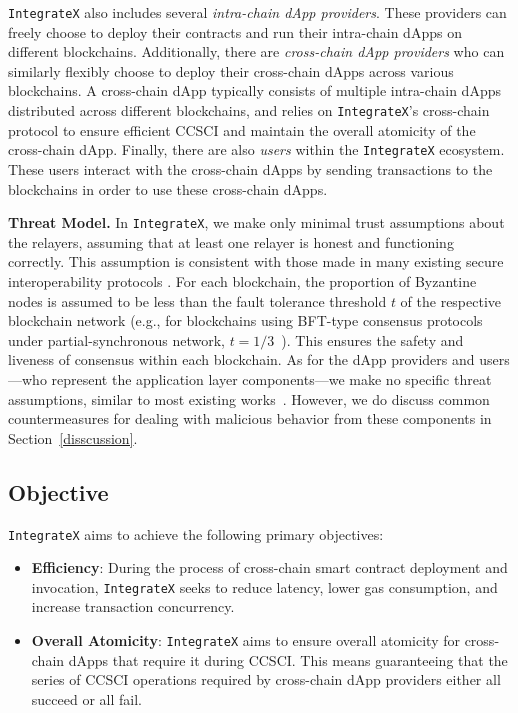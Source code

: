 \texttt{IntegrateX} also includes several \emph{intra-chain dApp providers}. 
These providers can freely choose to deploy their contracts and run their intra-chain dApps on different blockchains. 
Additionally, there are \emph{cross-chain dApp providers} who can similarly flexibly choose to deploy their cross-chain dApps across various blockchains. 
A cross-chain dApp typically consists of multiple intra-chain dApps distributed across different blockchains, and relies on \texttt{IntegrateX}'s cross-chain protocol to ensure efficient CCSCI and maintain the overall atomicity of the cross-chain dApp.
Finally, there are also \emph{users} within the \texttt{IntegrateX} ecosystem. 
These users interact with the cross-chain dApps by sending transactions to the blockchains in order to use these cross-chain dApps.

\vspace{3pt}
\noindent
\textbf{Threat Model.}
In \texttt{IntegrateX}, we make only minimal trust assumptions about the relayers, assuming that at least one relayer is honest and functioning correctly. 
This assumption is consistent with those made in many existing secure interoperability protocols \cite{atomic-ibc, cosmos2019, sheng2023trustboost, tas2023interchain}. 
For each blockchain, the proportion of Byzantine nodes is assumed to be less than the fault tolerance threshold $t$ of the respective blockchain network (e.g., for blockchains using BFT-type consensus protocols under partial-synchronous network, $t=1/3$~\cite{pbft}).
This ensures the safety and liveness of consensus within each blockchain.
As for the dApp providers and users—who represent the application layer components—we make no specific threat assumptions, similar to most existing works~\cite{cosmos2019,chen2024atomci,robinson2021general}. 
However, we do discuss common countermeasures for dealing with malicious behavior from these components in Section~\ref{disscussion}.

\subsection{Objective}

\texttt{IntegrateX} aims to achieve the following primary objectives:
\begin{itemize}[left=0pt]
\item \textbf{Efficiency}: During the process of cross-chain smart contract deployment and invocation, \texttt{IntegrateX} seeks to reduce latency, lower gas consumption, and increase transaction concurrency.
\item \textbf{Overall Atomicity}: \texttt{IntegrateX} aims to ensure overall atomicity for cross-chain dApps that require it during CCSCI. This means guaranteeing that the series of CCSCI operations required by cross-chain dApp providers either all succeed or all fail.
\end{itemize}

